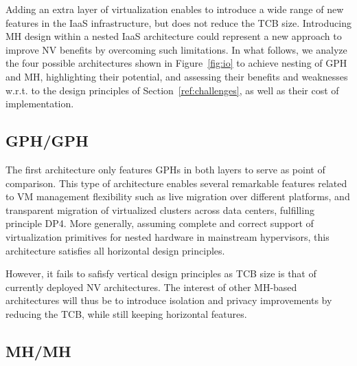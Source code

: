 \documentclass{sig-alternate}
\begin{document}
\noindent Adding an extra layer of virtualization enables to introduce a wide range of new features in the IaaS infrastructure, but does not reduce the TCB size. Introducing MH design within a nested IaaS architecture could represent a new approach to improve NV benefits by overcoming such limitations. In what follows, we analyze the four possible architectures shown in Figure~\ref{fig:io} to achieve nesting of GPH and MH, highlighting their potential, and assessing their benefits and weaknesses w.r.t. to the design principles of Section~\ref{ref:challenges}, as well as their cost of implementation.

\subsection{GPH/GPH}

\noindent The first architecture only features GPHs in both layers to serve as point of comparison. This type of architecture enables several remarkable features related to VM management flexibility such as live migration over different platforms, and transparent migration of virtualized clusters across data centers, fulfilling principle DP4. More generally, assuming complete and correct support of virtualization primitives for nested hardware in mainstream hypervisors, this architecture satisfies all horizontal design principles. 

However, it fails to safisfy vertical design principles as TCB size is that of currently deployed NV architectures. The interest of other MH-based architectures will thus be to introduce isolation and privacy improvements by reducing the TCB, while still keeping horizontal features.


\subsection{MH/MH}
\end{document}
